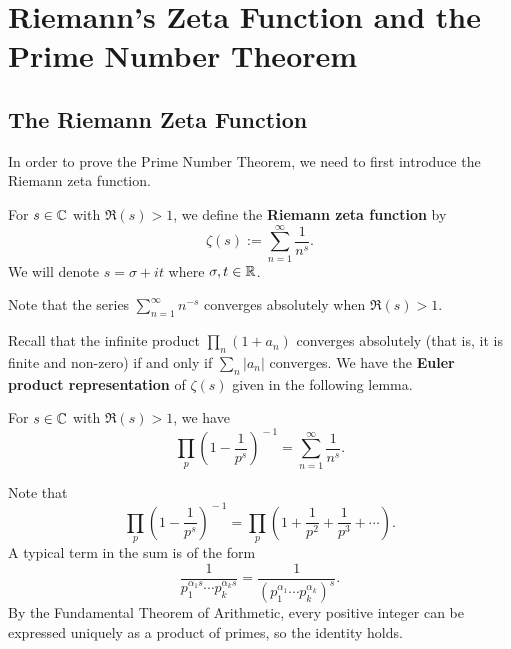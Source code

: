 \newpage 
\section{Riemann's Zeta Function and the Prime Number Theorem}

\subsection{The Riemann Zeta Function}
In order to prove the Prime Number Theorem, we need to 
first introduce the Riemann zeta function. 

\begin{defn}
For $s \in \mathbb{C}$ with $\Re(s) > 1$, we define the 
{\bf Riemann zeta function} by 
\[ \zeta(s) := \sum_{n=1}^\infty \frac1{n^s}. \]
We will denote $s = \sigma + it$ where $\sigma, t \in \mathbb{R}$. 
\end{defn}

Note that the series $\sum_{n=1}^\infty n^{-s}$ converges 
absolutely when $\Re(s) > 1$. 

Recall that the infinite product $\prod_n (1 + a_n)$ 
converges absolutely (that is, it is finite and non-zero)
if and only if $\sum_n |a_n|$ converges. We have the 
{\bf Euler product representation} of $\zeta(s)$ given 
in the following lemma. 

\begin{lemma}
For $s \in \mathbb{C}$ with $\Re(s) > 1$, we have 
\[ \prod_p \left( 1 - \frac1{p^s} \right)^{\!-1} = 
\sum_{n=1}^\infty \frac1{n^s}. \]
\end{lemma}
\begin{pf}
Note that 
\[ \prod_p \left( 1 - \frac1{p^s} \right)^{\!-1} = 
\prod_p \left(1 + \frac1{p^2} + \frac1{p^3} + \cdots \right). \]
A typical term in the sum is of the form 
\[ \frac{1}{p_1^{\alpha_1s} \cdots p_k^{\alpha_ks}}
= \frac{1}{(p_1^{\alpha_1} \cdots p_k^{\alpha_k})^s}. \]
By the Fundamental Theorem of Arithmetic, every positive 
integer can be expressed uniquely as a product of primes, 
so the identity holds.
\end{pf}

